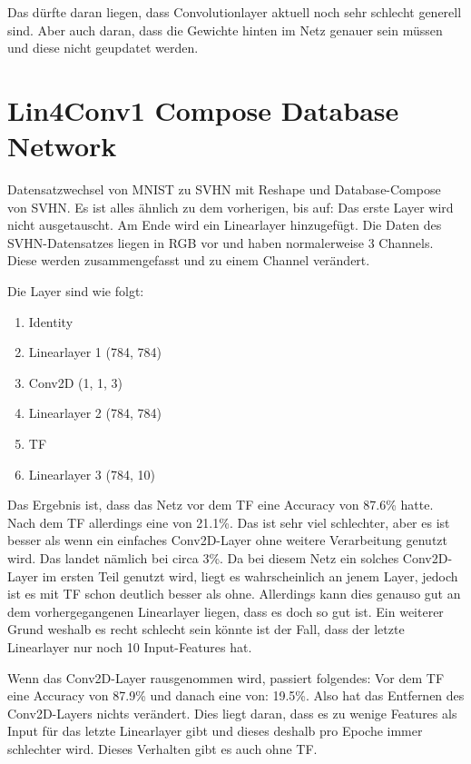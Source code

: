 
    Das dürfte daran liegen, dass Convolutionlayer aktuell noch sehr schlecht generell sind. 
    Aber auch daran, dass die Gewichte hinten im Netz genauer sein müssen und diese nicht 
    geupdatet werden. 

\section{Lin4Conv1 Compose Database Network}
    Datensatzwechsel von MNIST zu SVHN mit Reshape und Database-Compose von SVHN. 
    Es ist alles ähnlich zu dem vorherigen, bis auf: 
    Das erste Layer wird nicht ausgetauscht. Am Ende wird ein Linearlayer hinzugefügt. 
    Die Daten des SVHN-Datensatzes liegen in RGB vor und haben normalerweise 3 Channels. 
    Diese werden zusammengefasst und zu einem Channel verändert.

    Die Layer sind wie folgt: 
    \begin{enumerate}
        \item Identity
        \item Linearlayer 1 (784, 784)
        \item Conv2D (1, 1, 3)
        \item Linearlayer 2 (784, 784)
        \item TF
        \item Linearlayer 3 (784, 10)
    \end{enumerate}

    Das Ergebnis ist, dass das Netz vor dem TF eine Accuracy von 87.6\% hatte. Nach 
    dem TF allerdings eine von 21.1\%. Das ist sehr viel schlechter, aber es ist besser als 
    wenn ein einfaches Conv2D-Layer ohne weitere Verarbeitung genutzt wird. Das landet 
    nämlich bei circa 3\%. Da bei diesem Netz ein solches Conv2D-Layer im ersten Teil 
    genutzt wird, liegt es wahrscheinlich an jenem Layer, jedoch ist es mit TF schon 
    deutlich besser als ohne. Allerdings kann dies genauso gut an dem vorhergegangenen 
    Linearlayer liegen, dass es doch so gut ist. Ein weiterer Grund weshalb es recht schlecht 
    sein könnte ist der Fall, dass der letzte Linearlayer nur noch 10 Input-Features hat.

    Wenn das Conv2D-Layer rausgenommen wird, passiert folgendes: 
    Vor dem TF eine Accuracy von 87.9\% und danach eine von: 19.5\%. Also hat das Entfernen des 
    Conv2D-Layers nichts verändert. Dies liegt daran, dass es zu wenige Features als Input 
    für das letzte Linearlayer gibt und dieses deshalb pro Epoche immer schlechter wird. 
    Dieses Verhalten gibt es auch ohne TF. 


